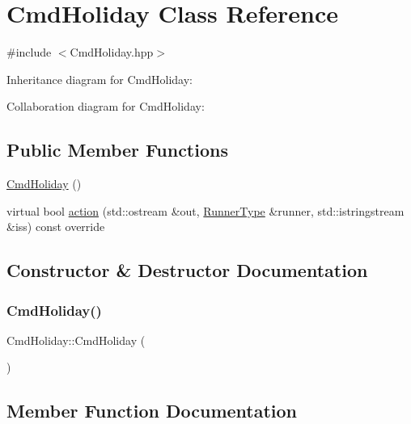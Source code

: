 \hypertarget{classCmdHoliday}{}\section{Cmd\+Holiday Class Reference}
\label{classCmdHoliday}


{\ttfamily \#include $<$Cmd\+Holiday.\+hpp$>$}



Inheritance diagram for Cmd\+Holiday\+:


Collaboration diagram for Cmd\+Holiday\+:
\subsection*{Public Member Functions}
\begin{DoxyCompactItemize}
\item 
\hyperlink{classCmdHoliday_aa2eb6480f535d82377c022d268e1a31e}{Cmd\+Holiday} ()
\item 
virtual bool \hyperlink{classCmdHoliday_adaaed1d04098dde0bfa8b3d6c3d322e1}{action} (std\+::ostream \&out, \hyperlink{Command_8hpp_ad45c3de597c2023a8be0399d914161f4}{Runner\+Type} \&runner, std\+::istringstream \&iss) const override
\end{DoxyCompactItemize}


\subsection{Constructor \& Destructor Documentation}
\mbox{\label{classCmdHoliday_aa2eb6480f535d82377c022d268e1a31e}} 
\subsubsection{\texorpdfstring{Cmd\+Holiday()}{CmdHoliday()}}
{\footnotesize\ttfamily Cmd\+Holiday\+::\+Cmd\+Holiday (\begin{DoxyParamCaption}{ }\end{DoxyParamCaption})}



\subsection{Member Function Documentation}
\mbox{\label{classCmdHoliday_adaaed1d04098dde0bfa8b3d6c3d322e1}} 

